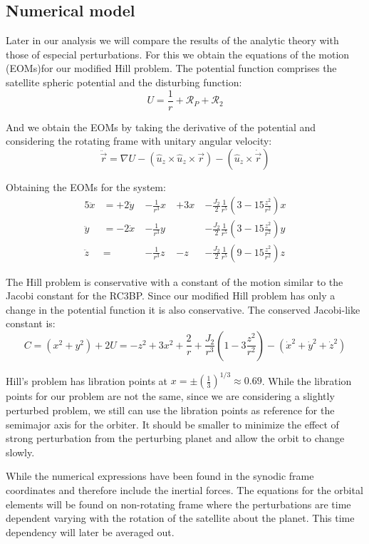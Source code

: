 \subsection{Numerical model}
Later in our analysis we will compare the results of the analytic theory with those of especial perturbations. For this we obtain the equations of the motion (EOMs)for our modified Hill problem. The potential function comprises the satellite spheric potential and the disturbing function:
\begin{equation}
U = \frac{1}{r} + \mathcal{R}_P + \mathcal{R}_2
\end{equation}

And we obtain the EOMs by taking the derivative of the potential and considering the rotating frame with unitary angular velocity:
\begin{equation}
\ddot{\vec{r}} = \nabla U  - \left(\hat{u}_z \times \hat{u}_z \times \vec{r}\right) - \left(\hat{u}_z \times \dot{\vec{r}}\right)
\end{equation}

Obtaining the EOMs for the system:
\begin{alignat}{5}
\label{eomX}
\ddot{x} &= +2 \dot{y} \	&-\frac{1}{r^3} x \	&+ 3x \	&- \frac{J_2 }{2} \frac{1}{r^5} \left(3 - 15 \frac{z^2}{r^2}\right) x\\
\label{eomY}
\ddot{y} &= -2 \dot{x} \	&-\frac{1}{r^3} y \	& 		&- \frac{J_2 }{2} \frac{1}{r^5} \left(3 - 15 \frac{z^2}{r^2}\right) y\\
\label{eomZ}
\ddot{z} &= 				&-\frac{1}{r^3} z \	&- z \	&- \frac{J_2 }{2} \frac{1}{r^5} \left(9 - 15 \frac{z^2}{r^2}\right) z
\end{alignat}

The Hill problem is conservative with a constant of the motion similar to the Jacobi constant for the RC3BP. Since our modified Hill problem has only a change in the potential function it is also conservative. The conserved Jacobi-like constant is:
\begin{equation}
C = (x^2 + y^2) + 2U = -z^2+ 3 x^2 + \frac{2}{r} + \frac{J_2}{r^3} \left(1 - 3 \frac{z^2}{r^2}\right) - (\dot{x}^2 + \dot{y}^2 + \dot{z}^2)
\end{equation}

Hill's problem has libration points at $x= \pm \left(\frac{1}{3}\right)^{1/3} \approx 0.69$. While the libration points for our problem are not the same, since we are considering a slightly perturbed problem, we still can use the libration points as reference for the semimajor axis for the orbiter. It should be smaller to minimize the effect of strong perturbation from the perturbing planet and allow the orbit to change slowly.

While the numerical expressions have been found in the synodic frame coordinates and therefore include the inertial forces. The equations for the orbital elements will be found on non-rotating frame where the perturbations are time dependent varying with the rotation of the satellite about the planet. This time dependency will later be averaged out.

